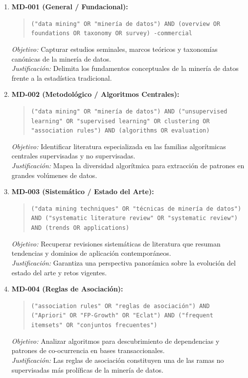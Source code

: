 \begin{enumerate}
  \item \textbf{MD-001 (General / Fundacional):}
  \begin{quote}
  \texttt{("data mining" OR "minería de datos") AND (overview OR foundations OR taxonomy OR survey) -commercial}
  \end{quote}
  \textit{Objetivo:} Capturar estudios seminales, marcos teóricos y taxonomías canónicas de la minería de datos.\\
  \textit{Justificación:} Delimita los fundamentos conceptuales de la minería de datos frente a la estadística tradicional.
  \item \textbf{MD-002 (Metodológico / Algoritmos Centrales):}
  \begin{quote}
  \texttt{("data mining" OR "minería de datos") AND ("unsupervised learning" OR "supervised learning" OR clustering OR "association rules") AND (algorithms OR evaluation)}
  \end{quote}
  \textit{Objetivo:} Identificar literatura especializada en las familias algorítmicas centrales supervisadas y no supervisadas.\\
  \textit{Justificación:} Mapea la diversidad algorítmica para extracción de patrones en grandes volúmenes de datos.
  \item \textbf{MD-003 (Sistemático / Estado del Arte):}
  \begin{quote}
  \texttt{("data mining techniques" OR "técnicas de minería de datos") AND ("systematic literature review" OR "systematic review") AND (trends OR applications)}
  \end{quote}
  \textit{Objetivo:} Recuperar revisiones sistemáticas de literatura que resuman tendencias y dominios de aplicación contemporáneos.\\
  \textit{Justificación:} Garantiza una perspectiva panorámica sobre la evolución del estado del arte y retos vigentes.
  \item \textbf{MD-004 (Reglas de Asociación):}
  \begin{quote}
  \texttt{("association rules" OR "reglas de asociación") AND ("Apriori" OR "FP-Growth" OR "Eclat") AND ("frequent itemsets" OR "conjuntos frecuentes")}
  \end{quote}
  \textit{Objetivo:} Analizar algoritmos para descubrimiento de dependencias y patrones de co-ocurrencia en bases transaccionales.\\
  \textit{Justificación:} Las reglas de asociación constituyen una de las ramas no supervisadas más prolíficas de la minería de datos.

\end{enumerate}
